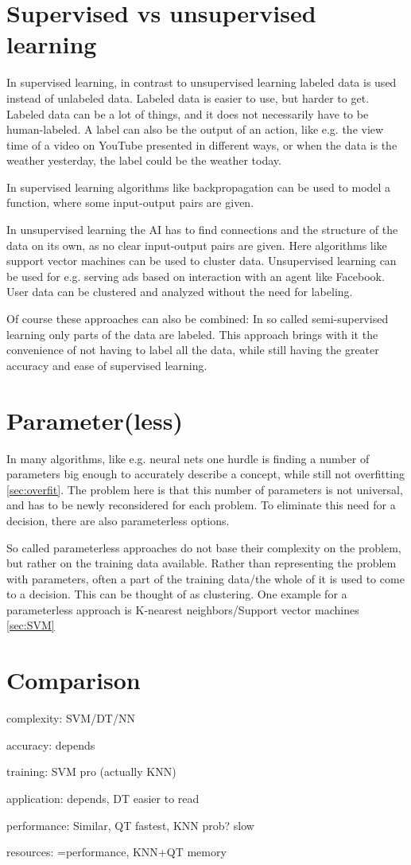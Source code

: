 \section{Supervised vs unsupervised learning} \cite[p695]{MA}
In supervised learning, in contrast to unsupervised learning labeled data is used instead of unlabeled data. 
Labeled data is easier to use, but harder to get. Labeled data can be a lot of things, and it does not necessarily have to be human-labeled. A label can also be the output of an action, like e.g. the view time of a video on YouTube presented in different ways, or when the data is the weather yesterday, the label could be the weather today.

In supervised learning algorithms like backpropagation can be used to model a function, where some input-output pairs are given.

In unsupervised learning the AI has to find connections and the structure of the data on its own, as no clear input-output pairs are given.
Here algorithms like support vector machines can be used to cluster data. Unsupervised learning can be used for e.g. serving ads based on interaction with an agent like Facebook. User data can be clustered and analyzed without the need for labeling.

Of course these approaches can also be combined: In so called semi-supervised learning only parts of the data are labeled. This approach brings with it the convenience of not having to label all the data, while still having the greater accuracy and ease of supervised learning.

\section{Parameter(less)} \cite[p737]{MA}
In many algorithms, like e.g. neural nets one hurdle is finding a number of parameters big enough to accurately describe a concept, while still not  overfitting \autoref{sec:overfit}. The problem here is that this number of parameters is not universal, and has to be newly reconsidered for each problem. To eliminate this need for a decision, there are also parameterless options. 

So called parameterless approaches do not base their complexity on the problem, but rather on the training data available. Rather than representing the problem with parameters, often a part of the training data/the whole of it is used to come to a decision. This can be thought of as clustering.
One example for a parameterless approach is K-nearest neighbors/Support vector machines \autoref{sec:SVM}

\section{Comparison}
complexity: SVM/DT/NN

accuracy: depends

training: SVM pro (actually KNN)

application: depends, DT easier to read

performance: Similar, QT fastest, KNN prob? slow

resources: =performance, KNN+QT memory
